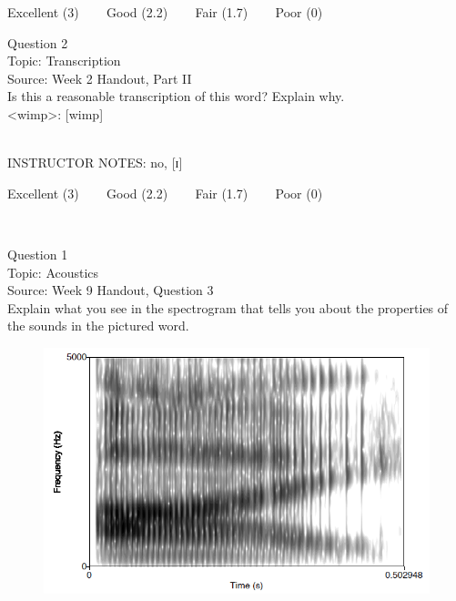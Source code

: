 \documentclass[12pt]{article}
\begin{document}
\vfill
Excellent (3) ~~~ Good (2.2) ~~~ Fair (1.7) ~~~ Poor (0)
\newpage

{\large Question 2}\\

Topic: Transcription\\
Source: Week 2 Handout, Part II\\

Is this a reasonable transcription of this word? Explain why.\\

<wimp>: {[wimp]}


~\\
INSTRUCTOR NOTES: no, [ɪ]


\vfill
Excellent (3) ~~~ Good (2.2) ~~~ Fair (1.7) ~~~ Poor (0)
\newpage

\begin{center}
\textbf{{\color{red}{\HUGE END OF EXAM}}}\\

\end{center}
\newpage

\begin{center}
\textbf{{\color{blue}{\HUGE START OF EXAM\\}}}

\textbf{{\color{blue}{\HUGE Student ID: 74145\\}}}

\textbf{{\color{blue}{\HUGE 4:50\\}}}

\end{center}
\newpage

{\large Question 1}\\

Topic: Acoustics\\
Source: Week 9 Handout, Question 3\\

Explain what you see in the spectrogram that tells you about the properties of the sounds in the pictured word.\\

\begin{figure}[H]
\includegraphics{../images/spectrogram_I.png}
\end{figure}
\end{document}
